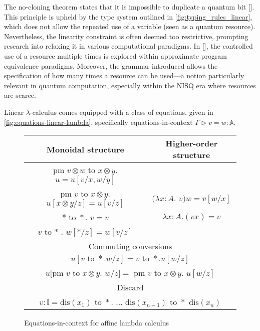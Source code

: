 \vspace{-8pt}
The no-cloning theorem states that it is impossible to duplicate a quantum bit [\cite{wootters1982single}]. This principle is upheld by the type system outlined in \autoref{fig:typing_rules_linear}, which does not allow the repeated use of a variable (seen as a quantum resource).
Nevertheless, the linearity
constraint is often deemed too restrictive, prompting research into relaxing it in various computational paradigms. In [\cite{dahlqvist2023complete}], the controlled use of a resource multiple times is explored within approximate program equivalence paradigms. Moreover, the grammar introduced allows the specification of how many times a resource can be used—a notion particularly relevant in quantum computation, especially within the NISQ era where resources are scarce.

Linear $\lambda$-calculus comes equipped with a class of equations, given in \autoref{fig:equations-linear-lambda}, specifically equations-in-context $\Gamma \triangleright v = w : \mathbb {A}$.

\begin{figure}[H]
  \centering
  \begin{tabular}{ |c|c| }
      \hline 
      Monoidal structure & Higher-order structure \\
      \hline
      pm $v \otimes w$ to $x \otimes y.$ $u = u[v/x,w/y]$& \\
      pm $v$ to $x \otimes y.$ $u[x \otimes y/z] = u[v/z]$ & $(\lambda x : A.$ $v) w = v[w/x]$\\
      $* \text { to } *.$ $v = v$ & $\lambda x : A.(v x) = v$ \\
      $v$ to $*$ . $w[* / z] = w[v / z]$ & \\
      \hline
      \multicolumn{2}{|c|}{Commuting conversions} \\
      \hline
      \multicolumn{2}{|c|}{$u[v \text{ to } \ast . w/z] = v \text{ to } \ast . u[w/z]$}  \\
      \multicolumn{2}{|c|}{$u[$pm $v$ to $x \otimes y.$ $w/z] =$ pm $v$ to $x \otimes y.$ $u[w/z]$} \\
      \hline
      \multicolumn{2}{|c|}{Discard} \\
      \hline
      \multicolumn{2}{|c|}{$v: \mathbb{I} = \text{dis}(x_1) \text{ to } \ast.$ $\ldots$ $\text{dis}(x_{n-1}) \text{ to } \ast \text{ dis}(x_{n})$} \\
      \hline
  \end{tabular}
  \caption{Equations-in-context for affine lambda calculus}
  \label{fig:equations-linear-lambda}
\end{figure}




